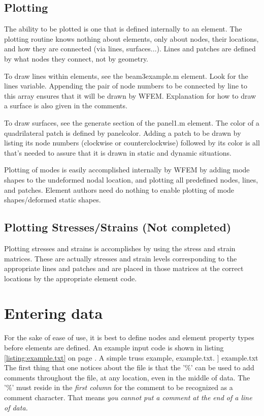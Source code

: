 \documentclass[12pt]{article}
\newcommand*{\command}[1]{\textsf{#1}}
\newcommand{\includelisting}[2]{{\small\label{listing:#1}#2, #1. }]{ #1}}}
\begin{document}
\subsection{Plotting}
The ability to be plotted is one that is defined internally to an
element. The plotting routine knows
nothing about elements, only about nodes, their locations, and how
they are connected (via lines, surfaces...). Lines and patches are
defined by what nodes they connect, not by geometry.

To draw lines within elements, see the \textsf{beam3example.m} element. Look for the lines variable. Appending the pair of node numbers to be connected by line to this array ensures that it will be drawn by WFEM. Explanation for how to draw a surface is also given in the comments.


To draw surfaces, see the generate section of the \textsf{panel1.m} element. The color of a quadrilateral patch is defined by \command{panelcolor}. Adding a patch to be drawn by listing its node numbers (clockwise or counterclockwise) followed by its color is all that's needed to assure that it is drawn in static and dynamic situations.

Plotting of modes
is easily accomplished internally by WFEM by adding mode shapes to the undeformed nodal
location, and plotting all predefined nodes, lines, and patches. Element authors need do nothing to enable plotting of mode shapes/deformed static shapes.
\subsection{Plotting Stresses/Strains (Not completed)}
Plotting stresses and strains is accomplishes by using the
\command{stress} and \command{strain} matrices. These are actually
stresses and strain levels corresponding to the appropriate lines and
patches and are placed in those matrices at the correct locations by
the appropriate element code.
\section{Entering data}
For the sake of ease of use, it is best to define nodes and element property types before elements are defined. An example input code is shown in listing \ref{listing:example.txt} on page \pageref{example.txt}.
%
\includelisting{example.txt}{A simple truss example\label{example.txt}}
The first thing that one notices about the file is that the '\%' can
be used to add comments throughout the file, at any location, even in
the middle of data. The '\%' must reside in the \emph{first column} for the
comment to be recognized as a comment character. That means \emph{you cannot put a comment at the end of a line of data.}
\end{document}
